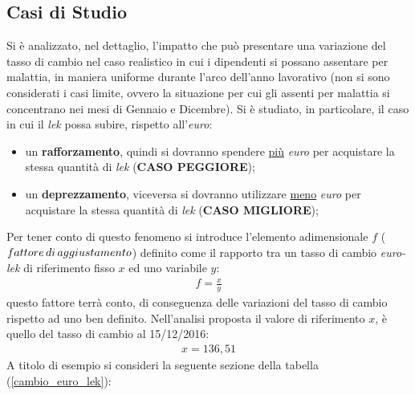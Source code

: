 \subsection[Casi di Studio]{Casi di Studio}
Si è analizzato, nel dettaglio, l'impatto che può presentare una variazione del tasso di cambio nel caso realistico in cui i dipendenti si possano assentare per malattia, in maniera uniforme durante l'arco dell'anno lavorativo (non si sono considerati i casi limite, ovvero la situazione per cui gli assenti per malattia si concentrano nei mesi di Gennaio e Dicembre). \newline Si è studiato, in particolare, il caso in cui il \emph{lek} possa subire, rispetto all'\emph{euro}:
\begin{itemize}
\item un \textbf{rafforzamento}, quindi si dovranno spendere \underline{più} \textit{euro} per acquistare la stessa quantità di \textit{lek} (\textbf{CASO PEGGIORE});
\item un \textbf{deprezzamento}, viceversa si dovranno utilizzare \underline{meno} \textit{euro} per acquistare la stessa quantità di \textit{lek} (\textbf{CASO MIGLIORE});
\end{itemize} 
Per tener conto di questo fenomeno si introduce l'elemento adimensionale $ f $ ($fattore \thinspace di \thinspace aggiustamento$) definito come il rapporto tra un tasso di cambio \emph{euro-lek} di riferimento fisso $x$ ed uno variabile $y$:
\begin{equation}
\label{eq:fattore_aggiustamento}
\begin{split}
	f = \frac{x}{y}
\end{split}
\end{equation}
questo fattore terrà conto, di conseguenza delle variazioni del tasso di cambio rispetto ad uno ben definito.
Nell'analisi proposta il valore di riferimento $x$, è quello del tasso di cambio al 15/12/2016:
\begin{equation}
\label{eq:fattore_aggiustamento_rif}
\begin{split}
	x = 136,51
\end{split}
\end{equation}
A titolo di esempio si consideri la seguente sezione della tabella (\ref{cambio_euro_lek}):
